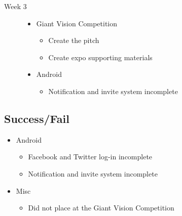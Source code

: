 \begin{description}
  \item[Week 3] \hfill
		\begin{itemize}
		\item Giant Vision Competition
		\begin{itemize}
			\item Create the pitch
			\item Create expo supporting materials
		\end{itemize}
		\item Android
		\begin{itemize}
			\item Notification and invite system incomplete
		\end{itemize}
	\end{itemize}
\end{description}

\subsection{Success/Fail}
\begin{itemize}
	\item Android
	\begin{itemize}
		\item Facebook and Twitter log-in incomplete
		\item Notification and invite system incomplete
	\end{itemize}
	\item Misc
	\begin{itemize}
		\item Did not place at the Giant Vision Competition
	\end{itemize}
\end{itemize}

